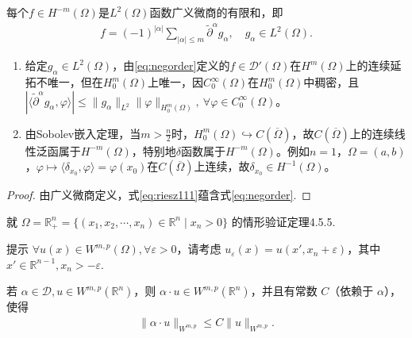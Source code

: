 \documentclass[../../main.tex]{subfiles}%
\begin{document}
\begin{corollary}
每个$f\in H^{-m}(\Omega)$是$L^{2}(\Omega)$函数广义微商的有限和，即
\begin{align}
f=(-1)^{|\alpha|}\sum\limits_{|\alpha|\leqslant m}\widetilde{\partial}^{\alpha}g_{\alpha},\quad g_{\alpha}\in L^{2}(\Omega).\label{eq:negorder}
\end{align}
\end{corollary}
\begin{remark}
\begin{enumerate}[(1)]
\item 给定$g_{\alpha}\in L^{2}(\Omega)$，由\eqref{eq:negorder}定义的$f\in\mathscr{D}'(\Omega)$在$H^{m}(\Omega)$上的连续延拓不唯一，但在$H_{0}^{m}(\Omega)$上唯一，因$C_{0}^{\infty}(\Omega)$在$H_{0}^{m}(\Omega)$中稠密，且$|\langle\widetilde{\partial}^{\alpha}g_{\alpha},\varphi\rangle|\leqslant\|g_{\alpha}\|_{L^{2}}\|\varphi\|_{H_{0}^{m}(\Omega)},\ \forall\varphi\in C_{0}^{\infty}(\Omega)$。
\item 由Sobolev嵌入定理，当$m>\frac{n}{2}$时，$H_{0}^{m}(\Omega)\hookrightarrow C(\overline{\Omega})$，故$C(\overline{\Omega})$上的连续线性泛函属于$H^{-m}(\Omega)$，特别地$\delta$函数属于$H^{-m}(\Omega)$。例如$n=1$，$\Omega=(a,b)$，$\varphi\mapsto\langle\delta_{x_{0}},\varphi\rangle=\varphi(x_{0})$在$C(\overline{\Omega})$上连续，故$\delta_{x_{0}}\in H^{-1}(\Omega)$。
\end{enumerate}
\end{remark}
\begin{proof}

由广义微商定义，式\eqref{eq:riesz111}蕴含式\eqref{eq:negorder}.

\end{proof}

\begin{example}
就 $\Omega=\mathbb{R}_+^n=\{(x_1,x_2,\cdots,x_n)\in\mathbb{R}^n\mid x_n>0\}$ 的情形验证定理4.5.5.

提示 $\forall u(x)\in W^{m,p}(\Omega),\forall\varepsilon>0$，请考虑 $u_\varepsilon(x)=u(x',x_n+\varepsilon)$，其中 $x'\in\mathbb{R}^{n-1},x_n>-\varepsilon$.
\end{example}

\begin{example}
若 $\alpha\in\mathscr{D},u\in W^{m,p}(\mathbb{R}^n)$，则 $\alpha\cdot u\in W^{m,p}(\mathbb{R}^n)$，并且有常数 $C$（依赖于 $\alpha$），使得
\begin{align*}
\|\alpha\cdot u\|_{W^{m,p}}\leqslant C\|u\|_{W^{m,p}}.
\end{align*}
\end{example}
\end{document}
